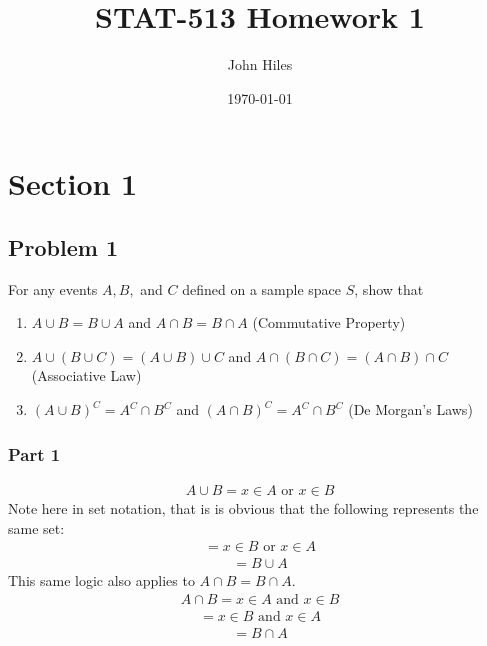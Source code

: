 \documentclass{article}
\title{STAT-513 Homework 1}
\author{John Hiles}
\date\today
\begin{document}
\maketitle %

\section*{Section 1}

\subsection*{Problem 1}
    For any events $A,B,$ \textrm{and} $C$ defined on a sample space $S$, show that 
    \begin{enumerate}
  \item
    $A\cup B = B\cup A$ and $A\cap B = B\cap A$ (Commutative Property)
  \item
    $A\cup (B\cup C) = (A\cup B) \cup C$ and $A\cap (B\cap C) = (A\cap B) \cap C$ (Associative Law)
  \item
    $(A\cup B)^C = A^C \cap B^C$ and $(A\cap B)^C = A^C \cap B^C$ (De Morgan's Laws)
    \end{enumerate}
\subsubsection*{Part 1}
\begin{align*}
A\cup B = x \in A \text{ or } x \in B
\end{align*}
Note here in set notation, that is is obvious that the following represents the same set:
\begin{align*}
 = x \in B \text{ or } x \in A
\end{align*}
\begin{align*}
 = B \cup A
\end{align*}
This same logic also applies to $A\cap B = B\cap A$.
	\begin{align*}
A\cap B = x \in A \text{ and } x \in B
\end{align*}
\begin{align*}
 = x \in B \text{ and } x \in A
\end{align*}
\begin{align*}
\boxed{ = B \cap A}
\end{align*}
\end{document}
